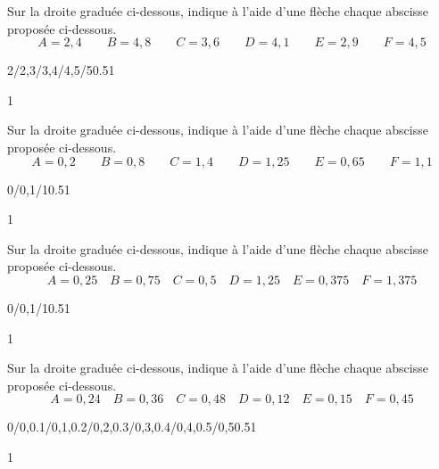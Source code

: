 \documentclass[a4paper,11pt]{report}
\begin{document}
\begin{exop}{
Sur la droite graduée ci-dessous, indique à l'aide d'une flèche chaque abscisse proposée ci-dessous.
$$A=2,4\qquad B=4,8\qquad C=3,6\qquad D=4,1\qquad E= 2,9 \qquad F=4,5$$
\begin{center}
\begin{numberlined}{2}{5}{1}{0.2}{2/2,3/3,4/4,5/5}{0.5}{1}{}
\end{numberlined}
\end{center}
}{1}\end{exop}

\begin{exop}{
Sur la droite graduée ci-dessous, indique à l'aide d'une flèche chaque abscisse proposée ci-dessous.
$$A=0,2\qquad B=0,8\qquad C=1,4\qquad D=1,25\qquad E= 0,65 \qquad F=1,1$$
\begin{center}
	\begin{numberlined}{0}{1.6}{1}{0.1}{0/0,1/1}{0.5}{1}{}
\end{numberlined}
\end{center}
}{1}\end{exop}

\begin{exop}{
Sur la droite graduée ci-dessous, indique à l'aide d'une flèche chaque abscisse proposée ci-dessous.
$$A=0,25\quad B=0,75\quad C=0,5\quad D=1,25\quad E= 0,375 \quad F=1,375$$
\begin{center}
\begin{numberlined}{0}{1.75}{1}{0.25}{0/0,1/1}{0.5}{1}{}
\end{numberlined}
\end{center}
}{1}\end{exop}

\begin{exop}{
Sur la droite graduée ci-dessous, indique à l'aide d'une flèche chaque abscisse proposée ci-dessous.
$$A=0,24\quad B=0,36\quad C=0,48\quad D=0,12\quad E= 0,15 \quad F=0,45$$
\begin{center}
	\begin{numberlined}{0}{0.5}{0.1}{0.02}{0/0,0.1/{0,1},0.2/{0,2},0.3/{0,3},0.4/{0,4},0.5/{0,5}}{0.5}{1}{}
\end{numberlined}
\end{center}
}{1}\end{exop}
\end{document}
